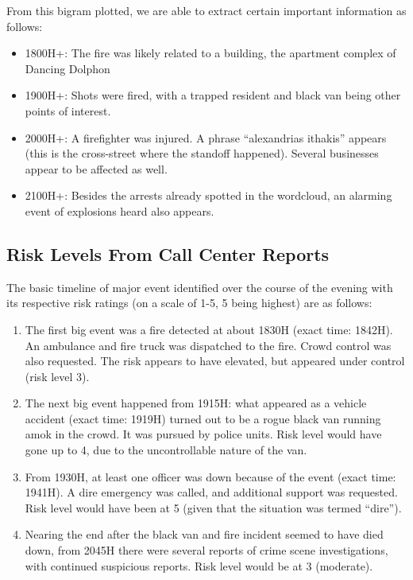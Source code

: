 \documentclass{acm_proc_article-sp}
\providecommand{\tightlist}{%
  \setlength{\itemsep}{0pt}\setlength{\parskip}{0pt}}
\begin{document}
From this bigram plotted, we are able to extract certain important
information as follows:

\begin{itemize}
\tightlist
\item
  1800H+: The fire was likely related to a building, the apartment
  complex of Dancing Dolphon
\item
  1900H+: Shots were fired, with a trapped resident and black van being
  other points of interest.
\item
  2000H+: A firefighter was injured. A phrase ``alexandrias ithakis''
  appears (this is the cross-street where the standoff happened).
  Several businesses appear to be affected as well.
\item
  2100H+: Besides the arrests already spotted in the wordcloud, an
  alarming event of explosions heard also appears.
\end{itemize}

\hypertarget{risk-levels-from-call-center-reports}{%
\subsection{Risk Levels From Call Center
Reports}\label{risk-levels-from-call-center-reports}}

The basic timeline of major event identified over the course of the
evening with its respective risk ratings (on a scale of 1-5, 5 being
highest) are as follows:

\begin{enumerate}
\def\labelenumi{\arabic{enumi}.}
\item
  The first big event was a fire detected at about 1830H (exact time:
  1842H). An ambulance and fire truck was dispatched to the fire. Crowd
  control was also requested. The risk appears to have elevated, but
  appeared under control (risk level 3).
\item
  The next big event happened from 1915H: what appeared as a vehicle
  accident (exact time: 1919H) turned out to be a rogue black van
  running amok in the crowd. It was pursued by police units. Risk level
  would have gone up to 4, due to the uncontrollable nature of the van.
\item
  From 1930H, at least one officer was down because of the event (exact
  time: 1941H). A dire emergency was called, and additional support was
  requested. Risk level would have been at 5 (given that the situation
  was termed ``dire'').
\item
  Nearing the end after the black van and fire incident seemed to have
  died down, from 2045H there were several reports of crime scene
  investigations, with continued suspicious reports. Risk level would be
  at 3 (moderate).
\end{enumerate}
\end{document}
